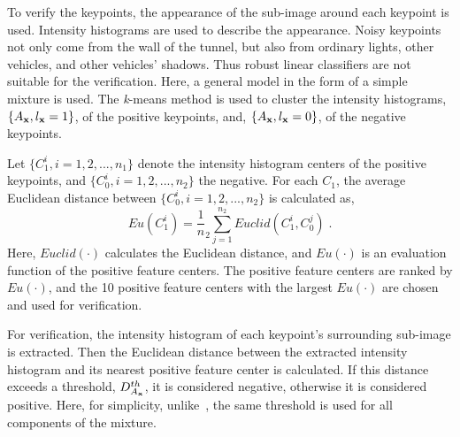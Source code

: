 To verify the keypoints, the appearance of the sub-image around each keypoint is used. Intensity histograms are used to describe the appearance. Noisy keypoints not only come from the wall of the tunnel, but also from ordinary lights, other vehicles, and other vehicles' shadows. Thus robust linear classifiers are not suitable for the verification. Here, a general model in the form of a simple mixture is used. The \emph{k}-means method is used to cluster the intensity histograms, $\{A_{\bf{x}},l_{\bf{x}}=1\}$, of the positive keypoints, and, $\{A_{\bf{x}},l_{\bf{x}}=0\}$,  of
the negative keypoints.

Let $\{C_1^i,i=1,2,...,n_1\}$ denote the intensity histogram centers of the positive keypoints, and $\{C_0^i,i=1,2,...,n_2\}$ the negative. For each $C_1$, the average Euclidean distance between $\{C_0^i,i=1,2,...,n_2\}$ is calculated as,
\begin{equation}
Eu(C_1^i)={\frac 1 n_2}\sum\limits^{n_2}_{j=1}Euclid(C_1^i,C_0^j)\;.
\label{eq2}
\end{equation}
Here, $Euclid(\cdot)$ calculates the Euclidean distance, and $Eu(\cdot)$ is an evaluation function of the positive feature centers. The positive feature centers are ranked by $Eu(\cdot)$, and the 10 positive feature centers with the largest $Eu(\cdot)$ are chosen and used for verification.

For verification, the intensity histogram of each keypoint's surrounding sub-image is extracted. Then the Euclidean distance between the extracted intensity histogram and its nearest positive feature center is calculated. If this distance exceeds a threshold, $D^{th}_{A_{\bf{x}}}$, it is considered negative, otherwise it is considered positive. Here, for simplicity, unlike~\citep{ac33}, the same threshold is used for all components of the mixture.


